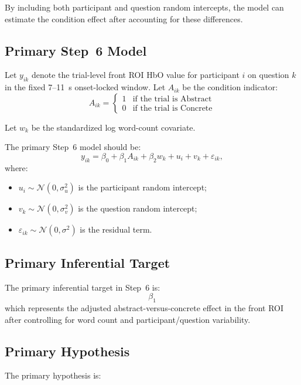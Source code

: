 \documentclass[11pt]{article}
\begin{document}
By including both participant and question random intercepts, the model can estimate the condition
effect after accounting for these differences.

\subsection{Primary Step~6 Model}
Let \(y_{ik}\) denote the trial-level front ROI HbO value for participant \(i\) on question \(k\)
in the fixed 7--11~s onset-locked window.
Let \(A_{ik}\) be the condition indicator:
\begin{equation}
A_{ik} =
\begin{cases}
1 & \text{if the trial is Abstract} \\
0 & \text{if the trial is Concrete}
\end{cases}
\end{equation}

Let \(w_k\) be the standardized log word-count covariate.

The primary Step~6 model should be:
\begin{equation}
y_{ik}
=
\beta_0
+
\beta_1 A_{ik}
+
\beta_2 w_k
+
u_i
+
v_k
+
\varepsilon_{ik},
\end{equation}
where:
\begin{itemize}
    \item \(u_i \sim \mathcal{N}(0, \sigma_u^2)\) is the participant random intercept;
    \item \(v_k \sim \mathcal{N}(0, \sigma_v^2)\) is the question random intercept;
    \item \(\varepsilon_{ik} \sim \mathcal{N}(0, \sigma^2)\) is the residual term.
\end{itemize}

\subsection{Primary Inferential Target}
The primary inferential target in Step~6 is:
\begin{equation}
\beta_1
\end{equation}
which represents the adjusted abstract-versus-concrete effect in the front ROI after controlling
for word count and participant/question variability.

\subsection{Primary Hypothesis}
The primary hypothesis is:
\end{document}
